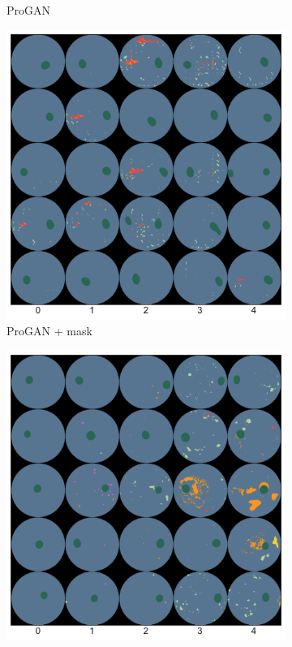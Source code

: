 \begin{figure}[h]
\begin{subfigure}{0.31\textwidth}
        \caption{ProGAN}
        \label{fig:progan_sample}
    \end{subfigure}
    \begin{subfigure}{0.31\textwidth}
        \centering
        \includegraphics[width=\linewidth]{labels/figs/progan_mask_sample.pdf}
        \caption{ProGAN + mask}
        \label{fig:progan_sample_2}
    \end{subfigure}
    \begin{subfigure}{0.31\textwidth}
        \centering
        \includegraphics[width=\linewidth]{labels/figs/copypaste_sample.pdf}

\end{subfigure}
\end{figure}
